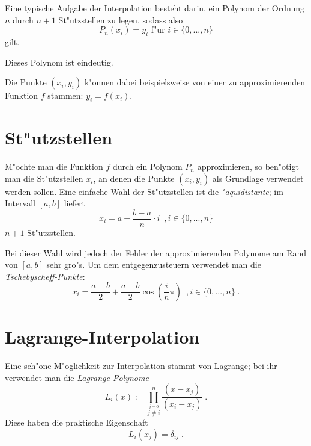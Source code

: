 \documentclass[a4paper]{book}
\begin{document}
Eine typische Aufgabe der Interpolation besteht darin, ein Polynom der
Ordnung $n$ durch $n+1$ St"utzstellen zu legen, sodass also
\begin{equation}
  \label{eq:26}
  P_n(x_i) = y_i \text{ f"ur } i \in \{0,...,n\}
\end{equation}
gilt. 
\begin{Wichtig}
  Dieses Polynom ist eindeutig.
\end{Wichtig}

Die Punkte $(x_i,y_i)$ k"onnen dabei beispielsweise von einer zu
approximierenden Funktion $f$ stammen: $y_i = f(x_i)$.


\section{St"utzstellen}
\label{sec:stutzstellen}

M"ochte man die Funktion $f$ durch ein Polynom $P_n$ approximieren, so
ben"otigt man die St"utzstellen $x_i$, an denen die Punkte $(x_i,y_i)$
als Grundlage verwendet werden sollen. Eine einfache Wahl der
St"utzstellen ist die \emph{"aquidistante}; im Intervall $[a,b]$ liefert
\begin{equation}
  \label{eq:27}
  x_i = a + \frac{b-a}{n} \cdot i ~ \;, i \in \{0,...,n\} 
\end{equation}
$n+1$ St"utzstellen.

Bei dieser Wahl wird jedoch der Fehler der approximierenden Polynome
am Rand von $[a,b]$ sehr gro"s. Um dem entgegenzusteuern
verwendet man die \emph{Tschebyscheff-Punkte}:
\begin{equation}
  \label{eq:28}
  x_i = \frac{a+b}{2} + \frac{a-b}{2} \cos\left ( \frac{i}{n} \pi
  \right ) ~\;, i \in \{0,...,n\} \;.
\end{equation}





\section{Lagrange-Interpolation}
\label{sec:lagrange_interpolation}

Eine sch"one M"oglichkeit zur Interpolation stammt von Lagrange; bei
ihr verwendet man die \emph{Lagrange-Polynome}
\begin{equation}
  \label{eq:29}
  L_i(x) := \prod_{\stackrel{j = 0}{j \neq i}} ^n \frac{(x-x_j)}{(x_i
    - x_j)} \;.
\end{equation}
Diese haben die praktische Eigenschaft
\begin{equation}
  \label{eq:30}
  L_i(x_j) = \delta_{ij} \;.
\end{equation}
\end{document}
